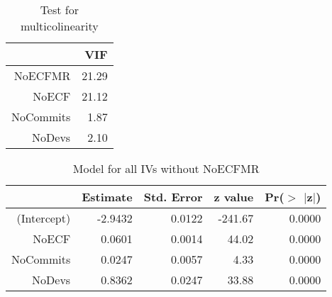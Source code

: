 \documentclass[times]{smrauth}
\newcommand{\red}[1]{ {\color{red}#1} }
\begin{document}
\begin{table}[tbp]
\centering
\caption{Test for multicolinearity} 
\label{tab:multicolinearitytest1}
\begin{tabular}{rr}
  \hline
 & VIF\\ 
  \hline
NoECFMR & \red{21.29} \\ 
  NoECF & \red{21.12} \\ 
  NoCommits & 1.87 \\ 
  NoDevs & 2.10 \\ 
   \hline
\end{tabular}
\end{table}






 
\begin{table}[tbp]
\centering
\caption{Model for all IVs without NoECFMR} 
\label{tab:modelwithoutsum}
\begin{tabular}{rrrrr}
  \hline
 & Estimate & Std. Error & z value & Pr($>$ $|$z$|$) \\ 
  \hline
(Intercept) & -2.9432 & 0.0122 & -241.67 & 0.0000 \\ 
  NoECF & 0.0601 & 0.0014 & 44.02 & 0.0000 \\ 
  NoCommits & 0.0247 & 0.0057 & 4.33 & 0.0000 \\ 
  NoDevs & 0.8362 & 0.0247 & 33.88 & 0.0000 \\ 
   \hline
\end{tabular}
\end{table}%
\end{document}
